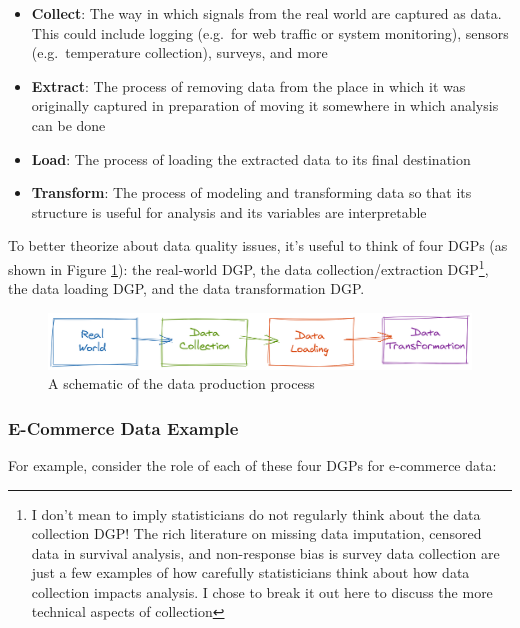 \documentclass[
]{krantz}
\providecommand{\tightlist}{%
  \setlength{\itemsep}{0pt}\setlength{\parskip}{0pt}}
\begin{document}
\begin{itemize}
\tightlist
\item
  \textbf{Collect}: The way in which signals from the real world are captured as data. This could include logging (e.g.~for web traffic or system monitoring), sensors (e.g.~temperature collection), surveys, and more
\item
  \textbf{Extract}: The process of removing data from the place in which it was originally captured in preparation of moving it somewhere in which analysis can be done
\item
  \textbf{Load}: The process of loading the extracted data to its final destination
\item
  \textbf{Transform}: The process of modeling and transforming data so that its structure is useful for analysis and its variables are interpretable
\end{itemize}

To better theorize about data quality issues, it's useful to think of four DGPs (as shown in Figure \ref{fig:dgp}): the real-world DGP, the data collection/extraction DGP\footnote{I don't mean to imply statisticians do not regularly think about the data collection DGP! The rich literature on missing data imputation, censored data in survival analysis, and non-response bias is survey data collection are just a few examples of how carefully statisticians think about how data collection impacts analysis. I chose to break it out here to discuss the more technical aspects of collection}, the data loading DGP, and the data transformation DGP.

\begin{figure}

{\centering \includegraphics[width=0.9\linewidth]{figures/data-dall/dgp} 

}

\caption{A schematic of the data production process}\label{fig:dgp}
\end{figure}

\hypertarget{e-commerce-data-example}{%
\subsubsection{E-Commerce Data Example}\label{e-commerce-data-example}}

For example, consider the role of each of these four DGPs for e-commerce data:
\end{document}
